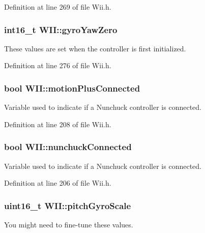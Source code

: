 \-Definition at line 269 of file \-Wii.\-h.

\hypertarget{class_w_i_i_ad4f0d2456c56414f9b8013b85a1ee7d2}{
\subsubsection[{gyro\-Yaw\-Zero}]{\setlength{\rightskip}{0pt plus 5cm}int16\-\_\-t {\bf \-W\-I\-I\-::gyro\-Yaw\-Zero}}}\label{class_w_i_i_ad4f0d2456c56414f9b8013b85a1ee7d2}
\-These values are set when the controller is first initialized. 

\-Definition at line 276 of file \-Wii.\-h.

\hypertarget{class_w_i_i_a72bd4fad2e524276712a154b8cc2a16c}{
\subsubsection[{motion\-Plus\-Connected}]{\setlength{\rightskip}{0pt plus 5cm}bool {\bf \-W\-I\-I\-::motion\-Plus\-Connected}}}\label{class_w_i_i_a72bd4fad2e524276712a154b8cc2a16c}
\-Variable used to indicate if a \-Nunchuck controller is connected. 

\-Definition at line 208 of file \-Wii.\-h.

\hypertarget{class_w_i_i_a7cb4cec343c65fd350e6b05043d7f1a8}{
\subsubsection[{nunchuck\-Connected}]{\setlength{\rightskip}{0pt plus 5cm}bool {\bf \-W\-I\-I\-::nunchuck\-Connected}}}\label{class_w_i_i_a7cb4cec343c65fd350e6b05043d7f1a8}
\-Variable used to indicate if a \-Nunchuck controller is connected. 

\-Definition at line 206 of file \-Wii.\-h.

\hypertarget{class_w_i_i_aea6ce6f3222df3e547e9957673c7a07a}{
\subsubsection[{pitch\-Gyro\-Scale}]{\setlength{\rightskip}{0pt plus 5cm}uint16\-\_\-t {\bf \-W\-I\-I\-::pitch\-Gyro\-Scale}}}\label{class_w_i_i_aea6ce6f3222df3e547e9957673c7a07a}
\-You might need to fine-\/tune these values. 

